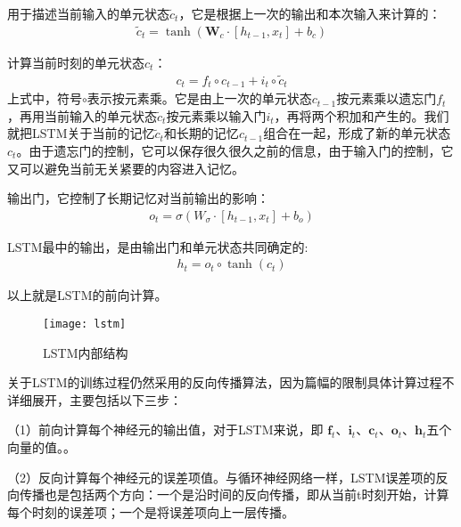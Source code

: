 用于描述当前输入的单元状态$\tilde{c}_{t}$，它是根据上一次的输出和本次输入来计算的：
\begin{equation}
\begin{aligned}
\tilde{c}_{t}=\tanh (\mathbf{W}_{c} \cdot [h_{t-1}, x_{t}]+b_{c})
\end{aligned}
\end{equation}

计算当前时刻的单元状态$c_{t}$：
\begin{equation}
\begin{aligned}
c_{t}=f_{t} \circ c_{t-1} + i_{t} \circ \tilde{c}_{t}
\end{aligned}
\end{equation}
上式中，符号$\circ$表示按元素乘。它是由上一次的单元状态$c_{t-1}$按元素乘以遗忘门$f_{t}$，再用当前输入的单元状态$\tilde{c}_{t}$按元素乘以输入门$i_{t}$，再将两个积加和产生的。我们就把LSTM关于当前的记忆$\tilde{c}_{t}$和长期的记忆$c_{t-1}$组合在一起，形成了新的单元状态$c_{t}$。由于遗忘门的控制，它可以保存很久很久之前的信息，由于输入门的控制，它又可以避免当前无关紧要的内容进入记忆。

输出门，它控制了长期记忆对当前输出的影响：
\begin{equation}
\begin{aligned}
o_{t}=\sigma(W_{\sigma} \cdot [h_{t-1}, x_{t}]+b_{o})
\end{aligned}
\end{equation}

LSTM最中的输出，是由输出门和单元状态共同确定的:
\begin{equation}
\begin{aligned}
h_{t}=o_{t} \circ \tanh(c_{t})
\end{aligned}
\end{equation}

以上就是LSTM的前向计算。
\begin{figure}[htbp]
\centering
\texttt{[image: lstm]}
\caption{LSTM内部结构}
\label{fig:lstm}
\end{figure}

关于LSTM的训练过程仍然采用的反向传播算法，因为篇幅的限制具体计算过程不详细展开，主要包括以下三步：

（1）前向计算每个神经元的输出值，对于LSTM来说，即 $\mathbf{f}_{t}$、$\mathbf{i}_{t}$、$\mathbf{c}_{t}$、$\mathbf{o}_{t}$、$\mathbf{h}_{t}$五个向量的值。。

（2）反向计算每个神经元的误差项值。与循环神经网络一样，LSTM误差项的反向传播也是包括两个方向：一个是沿时间的反向传播，即从当前t时刻开始，计算每个时刻的误差项；一个是将误差项向上一层传播。

